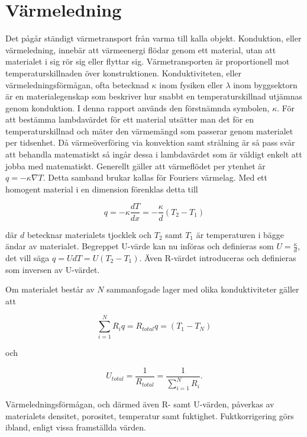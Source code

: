 \section{Värmeledning}\label{sec:heatconduction}

Det pågår ständigt värmetransport från varma till kalla objekt. Konduktion, eller värmeledning, innebär att värmeenergi flödar genom ett material, utan att materialet i sig rör sig eller flyttar sig. Värmetransporten är proportionell mot temperaturskillnaden över konstruktionen. Konduktiviteten, eller värmeledningsförmågan, ofta betecknad $\kappa$ inom fysiken eller $\lambda$ inom byggsektorn är en materialegenskap som beskriver hur snabbt en temperaturskillnad utjämnas genom konduktion. I denna rapport används den förstnämnda symbolen, $\kappa$. För att bestämma lambdavärdet för ett material utsätter man det för en temperaturskillnad och mäter den värmemängd som passerar genom materialet per tidsenhet. Då värmeöverföring via konvektion samt strålning är så pass svår att behandla matematiskt så ingår dessa i lambdavärdet som är väldigt enkelt att jobba med matematiskt. Generellt gäller att värmeflödet per ytenhet är $q = - \kappa \nabla T$. Detta samband brukar kallas för Fouriers värmelag. Med ett homogent material i en dimension förenklas detta till

\begin{equation}\label{eq:conduction:fourier}\boxed{ \; \; \;
q = -\kappa \frac{dT}{dx} = -\frac{\kappa}{d}\left( T_2-T_1\right)
\; \; \; }
\end{equation}

där $d$ betecknar materialets tjocklek och $T_2$ samt $T_1$ är temperaturen i bägge ändar av materialet. Begreppet U-värde kan nu införas och definieras som $U = \frac{\kappa}{d}$, det vill säga $q = UdT = U\left( T_2-T_1 \right)$. Även R-värdet introduceras och definieras som inversen av U-värdet.

Om materialet består av $N$ sammanfogade lager med olika konduktiviteter gäller att

\begin{equation}
\sum_{i=1}^N R_i q = R_{total}q = \left( T_{1} - T_{N} \right)
\end{equation} 

och 

\begin{equation}
U_{total} = \frac{1}{R_{total}} = \frac{1}{\sum_{i=1}^N R_i}.
\end{equation}

Värmeledningsförmågan, och därmed även R- samt U-värden, påverkas av materialets densitet, porositet, temperatur samt fuktighet. Fuktkorrigering görs ibland, enligt vissa framställda värden.

